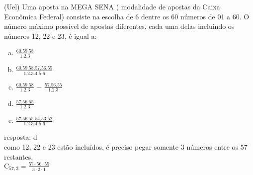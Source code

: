 \begin{ex}
 (Uel) Uma aposta na MEGA SENA ( modalidade de apostas da Caixa Econômica Federal) consiste na escolha de 6 dentre os 60 números de 01 a 60. O número máximo possível de apostas diferentes, cada uma delas incluindo os números 12, 22 e 23, é igual a:
    \begin{enumerate}[(a)]
    \item $\frac{60.59.58}{1.2.3}$
    \item $\frac{60.59.58.57.56.55}{1.2.3.4.5.6}$
    \item $\frac{60.59.58}{1.2.3}$ $-$ $\frac{57.56.55}{1.2.3}$
    \item $\frac{57.56.55}{1.2.3}$
    \item $\frac{57.56.55.54.53.52}{1.2.3.4.5.6}$
    \end{enumerate}
      \begin{sol}
       resposta: d \\
       como 12, 22 e 23 estão incluídos, é preciso pegar somente 3 números entre os 57 restantes. \\
       $\mathrm{C}_{{57},3}=\frac{57\cdot56\cdot55}{3\cdot2\cdot1}$
      \end{sol}
\end{ex}